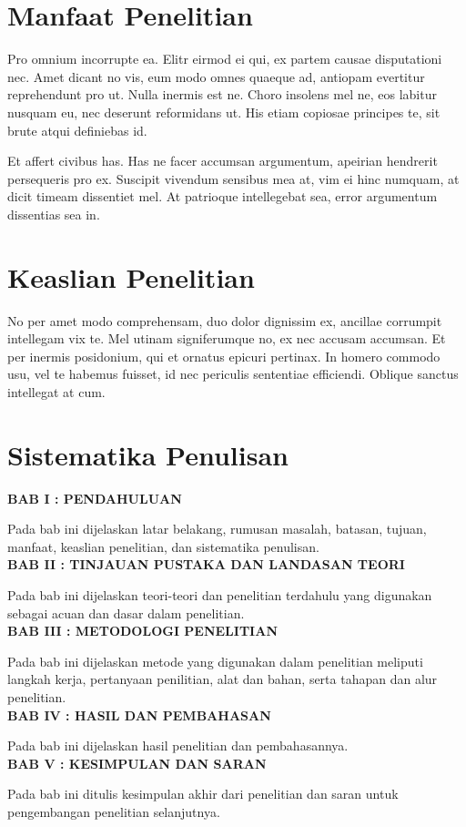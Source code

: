 \section{Manfaat Penelitian}
Pro omnium incorrupte ea. Elitr eirmod ei qui, ex partem causae disputationi nec. Amet dicant no vis, eum modo omnes quaeque ad, antiopam evertitur reprehendunt pro ut. Nulla inermis est ne. Choro insolens mel ne, eos labitur nusquam eu, nec deserunt reformidans ut. His etiam copiosae principes te, sit brute atqui definiebas id.

Et affert civibus has. Has ne facer accumsan argumentum, apeirian hendrerit persequeris pro ex. Suscipit vivendum sensibus mea at, vim ei hinc numquam, at dicit timeam dissentiet mel. At patrioque intellegebat sea, error argumentum dissentias sea in.


\section{Keaslian Penelitian}
No per amet modo comprehensam, duo dolor dignissim ex, ancillae corrumpit intellegam vix te. Mel utinam signiferumque no, ex nec accusam accumsan. Et per inermis posidonium, qui et ornatus epicuri pertinax. In homero commodo usu, vel te habemus fuisset, id nec periculis sententiae efficiendi. Oblique sanctus intellegat at cum.


\section{Sistematika Penulisan}
\noindent
\textbf{BAB I : PENDAHULUAN}

Pada bab ini dijelaskan latar belakang, rumusan masalah, batasan, tujuan, manfaat, keaslian penelitian, dan sistematika penulisan.\\

\noindent
\textbf{BAB II : TINJAUAN PUSTAKA DAN LANDASAN TEORI}

Pada bab ini dijelaskan teori-teori dan penelitian terdahulu yang digunakan sebagai acuan dan dasar dalam penelitian.\\

\noindent
\textbf{BAB III : METODOLOGI PENELITIAN}

Pada bab ini dijelaskan metode yang digunakan dalam penelitian meliputi langkah kerja, pertanyaan penilitian, alat dan bahan, serta tahapan dan alur penelitian.\\

\noindent
\textbf{BAB IV : HASIL DAN PEMBAHASAN}

Pada bab ini dijelaskan hasil penelitian dan pembahasannya.\\

\noindent
\textbf{BAB V : KESIMPULAN DAN SARAN}

Pada bab ini ditulis kesimpulan akhir dari penelitian dan saran untuk pengembangan penelitian selanjutnya.\\

\begin{comment}

\end{comment}
